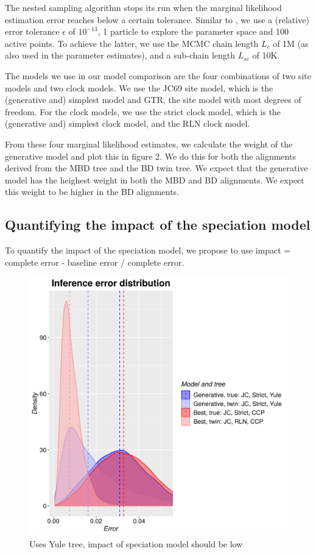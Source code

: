 The nested sampling algorithm stops its run 
when the marginal likelihood estimation error 
reaches below a certain tolerance.  
Similar to \cite{maturana2018},
we use a (relative) error tolerance $\epsilon$ of $10^{-13}$,
1 particle to explore the parameter space
and 100 active points. 
To achieve the latter, we use the MCMC chain length $L_c$ of 1M 
(as also used in the parameter estimates),
and a sub-chain length $L_{sc}$ of 10K.

The models we use in our model comparison are the four combinations
of two site models and two clock models. We use the JC69 site model, which
is the (generative and) simplest model and GTR, the site model with most
degrees of freedom. For the clock models, we use the strict clock model,
which is the (generative and) simplest clock model, and the RLN clock model.

From these four marginal likelihood estimates, we calculate the weight of
the generative model and plot this in figure 2. We do this for both the 
alignments derived from the MBD tree and the BD twin tree. We expect that
the generative model has the heighest weight in both the MBD and BD alignments.
We expect this weight to be higher in the BD alignments.
\fi

\subsection{Quantifying the impact of the speciation model}

To quantify the impact of the speciation model, we propose to
use impact = complete error - baseline error / complete error.



\begin{figure}[!htbp]
  \includegraphics[width=\textwidth]{razzo-figures/pir_ex_3_errors.png}
  \caption{
    Uses Yule tree, impact of speciation model should be low
  }
  \label{fig:results}
\end{figure}

